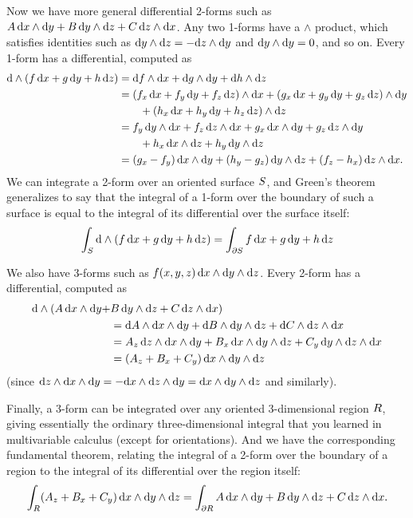 \documentclass[12pt]{amsart}
\begin{document}
Now we have more general differential 2-forms such as $A\,\dx\wedge\dy + B\,\dy\wedge\dz + C \,\dz\wedge\dx$.
Any two 1-forms have a $\wedge$ product, which satisfies identities such as $\dy\wedge\dz = -\dz\wedge\dy$ and $\dy\wedge\dy=0$, and so on.
Every 1-form has a differential, computed as
\begin{align*}
  \ed(f\,\dx + g\,\dy + h\,\dz)
  &= \df\wedge\dx + \dg\wedge\dy + \dh\wedge\dz\\
  &= (\pder f x \,\dx + \pder f y \,\dy + \pder f z\,\dz)\wedge\dx + (\pder g x \,\dx + \pder g y \,\dy + \pder g z\,\dz)\wedge\dy\\
  &\qquad + (\pder h x \,\dx + \pder h y \,\dy + \pder h z\,\dz)\wedge\dz\\
  &= \pder f y \,\dy\wedge\dx + \pder f z\,\dz\wedge\dx + \pder g x \,\dx\wedge\dy + \pder g z\,\dz \wedge\dy \\
  &\qquad + \pder h x\,\dx\wedge\dz + \pder h y \,\dy\wedge\dz\\
  &= (\pder g x - \pder f y)\,\dx\wedge\dy + (\pder h y - \pder g z) \,\dy\wedge\dz + (\pder f z - \pder h x)\,\dz\wedge\dx.
\end{align*}
We can integrate a 2-form over an oriented surface $\surf$, and Green's theorem generalizes to say that the integral of a 1-form over the boundary of such a surface is equal to the integral of its differential over the surface itself:
\begin{equation}
  \int_{\surf} \ed(f\,\dx + g\,\dy + h\,\dz) = \int_{\bdry\surf} f\,\dx + g\,\dy + h\,\dz\label{eq:stokes-theorem}
\end{equation}

We also have 3-forms such as $f(x,y,z)\, \dx\wedge\dy\wedge\dz$.
Every 2-form has a differential, computed as
\begin{align*}
  \ed(A\,\dx\wedge\dy + & B\,\dy\wedge\dz + C \,\dz\wedge\dx)\\
  &= \dd A \wedge \dx \wedge \dy + \dd B \wedge \dy \wedge \dz + \dd C \wedge \dz \wedge \dx\\
  &= \pder A z\, \dz \wedge \dx \wedge \dy + \pder B x \,\dx \wedge \dy \wedge \dz + \pder C y \,\dy\wedge \dz \wedge \dx\\
  &= (\pder A z + \pder B x + \pder C y)\, \dx\wedge\dy\wedge \dz
\end{align*}
(since $\dz \wedge \dx \wedge \dy = -\dx \wedge \dz \wedge \dy = \dx \wedge \dy \wedge \dz$ and similarly).

Finally, a 3-form can be integrated over any oriented 3-dimensional region $\region$, giving essentially the ordinary three-dimensional integral that you learned in multivariable calculus (except for orientations).
And we have the corresponding fundamental theorem, relating the integral of a 2-form over the boundary of a region to the integral of its differential over the region itself:
\begin{equation}
  \int_{\region} (\pder A z + \pder B x + \pder C y)\, \dx\wedge\dy\wedge \dz = \int_{\bdry\region} A\,\dx\wedge\dy + B\,\dy\wedge\dz + C \,\dz\wedge\dx.\label{eq:divergence-theorem}
\end{equation}
\end{document}
